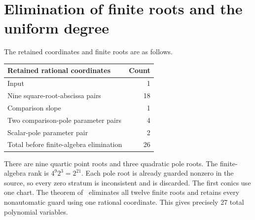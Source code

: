 \documentclass[11pt,a4paper]{article}
\begin{document}
\section{Elimination of finite roots and the uniform degree}

The retained coordinates and finite roots are as follows.
\begin{center}
\begin{tabular}{lr}
\toprule
Retained rational coordinates & Count\\
\midrule
Input & 1\\
Nine square-root-abscissa pairs & 18\\
Comparison slope & 1\\
Two comparison-pole parameter pairs & 4\\
Scalar-pole parameter pair & 2\\
\midrule
Total before finite-algebra elimination & 26\\
\bottomrule
\end{tabular}
\end{center}
There are nine quartic point roots and three quadratic pole roots.
The finite-algebra rank is $4^9 2^3=2^{21}$. Each pole root is
already guarded nonzero in the source, so every zero stratum is
inconsistent and is discarded. The first conics use one chart.
The theorem of~\cite{Active} eliminates all twelve finite roots
and retains every nonautomatic guard using one rational coordinate.
This gives precisely 27 total polynomial variables.
\end{document}
